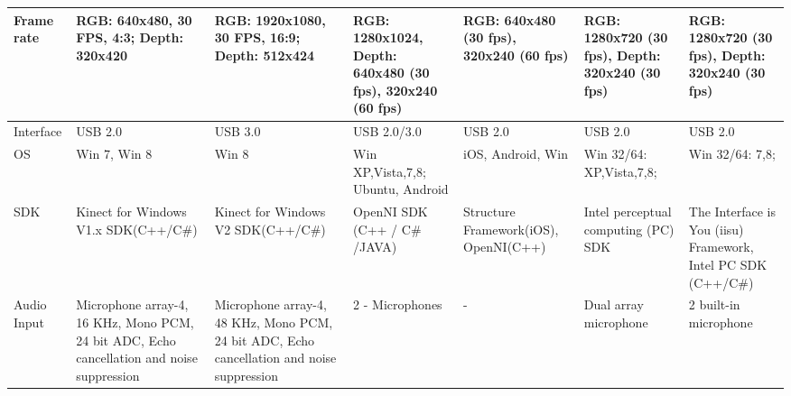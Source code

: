 \begin{landscape}
\begin{table}
\begin{tabularx}{600pt}{c*6{X}}
  \multicolumn{1}{l}{Frame rate }         & RGB: 640x480, 30 FPS, 4:3; Depth: 320x420
  										 & RGB: 1920x1080, 30 FPS, 16:9; Depth: 512x424
  										 & RGB: 1280x1024, Depth: 640x480 (30 fps), 320x240 (60 fps)
  										 & RGB: 640x480 (30 fps), 320x240 (60 fps)
  										 & RGB: 1280x720 (30 fps), Depth: 320x240 (30 fps)
  										 & RGB: 1280x720 (30 fps), Depth: 320x240 (30 fps)
  										 \tabularnewline\midrule
  										 
  \multicolumn{1}{l}{Interface}           & USB 2.0
  										 & USB 3.0
  										 & USB 2.0/3.0 
  										 & USB 2.0
  										 & USB 2.0
  										 & USB 2.0
  										 \tabularnewline\midrule	
  
  \multicolumn{1}{l}{OS}                  & Win 7, Win 8
  										 & Win 8
  										 & Win XP,Vista,7,8; Ubuntu, Android
  										 & iOS, Android, Win
  										 & Win 32/64: XP,Vista,7,8;
  										 & Win 32/64: 7,8; 
  										 \tabularnewline\midrule	
  										 										 								
  
  \multicolumn{1}{l}{SDK}                 & Kinect for Windows V1.x SDK(C++/C\#)
  										 & Kinect for Windows V2 SDK(C++/C\#)
  										 & OpenNI SDK (C++ / C\# /JAVA)
  										 & Structure Framework(iOS), OpenNI(C++)
  										 & Intel perceptual computing (PC) SDK 
  										 & The Interface is You (iisu) Framework, Intel PC SDK (C++/C\#)
  										 \tabularnewline\midrule	
  										 
  										 
  \multicolumn{1}{l}{Audio Input}        &  Microphone array-4, 16 KHz, Mono PCM, 24 bit ADC, Echo cancellation        											and noise suppression 
  										&  Microphone array-4, 48 KHz, Mono PCM, 24 bit ADC, Echo cancellation        											and noise suppression 
  										&  2 - Microphones 
  										&  - 
  										&  Dual array microphone 
  										& 2 built-in microphone
  										\tabularnewline
  										\bottomrule
\end{tabularx}
\end{table}
\end{landscape}